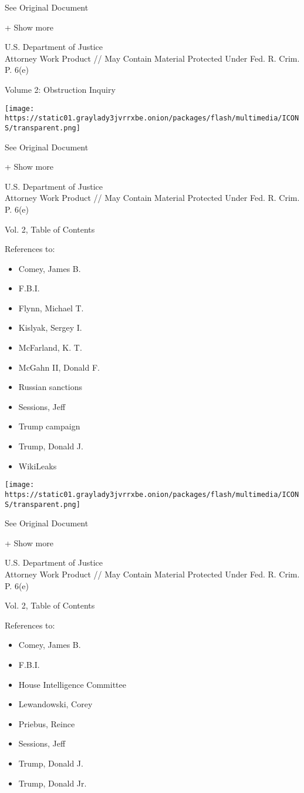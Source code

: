 See Original Document

+ Show more

U.S. Department of Justice\\
Attorney Work Product // May Contain Material Protected Under Fed. R.
Crim. P. 6(e)

Volume 2: Obstruction Inquiry

\protect\hyperlink{}{}

\texttt{[image: https://static01.graylady3jvrrxbe.onion/packages/flash/multimedia/ICONS/transparent.png]}

See Original Document

+ Show more

U.S. Department of Justice\\
Attorney Work Product // May Contain Material Protected Under Fed. R.
Crim. P. 6(e)

Vol. 2, Table of Contents

References to:

\begin{itemize}
\tightlist
\item
  Comey, James B.
\item
  F.B.I.
\item
  Flynn, Michael T.
\item
  Kislyak, Sergey I.
\item
  McFarland, K. T.
\item
  McGahn II, Donald F.
\item
  Russian sanctions
\item
  Sessions, Jeff
\item
  Trump campaign
\item
  Trump, Donald J.
\item
  WikiLeaks
\end{itemize}

\protect\hyperlink{}{}

\texttt{[image: https://static01.graylady3jvrrxbe.onion/packages/flash/multimedia/ICONS/transparent.png]}

See Original Document

+ Show more

U.S. Department of Justice\\
Attorney Work Product // May Contain Material Protected Under Fed. R.
Crim. P. 6(e)

Vol. 2, Table of Contents

References to:

\begin{itemize}
\tightlist
\item
  Comey, James B.
\item
  F.B.I.
\item
  House Intelligence Committee
\item
  Lewandowski, Corey
\item
  Priebus, Reince
\item
  Sessions, Jeff
\item
  Trump, Donald J.
\item
  Trump, Donald Jr.
\end{itemize}


